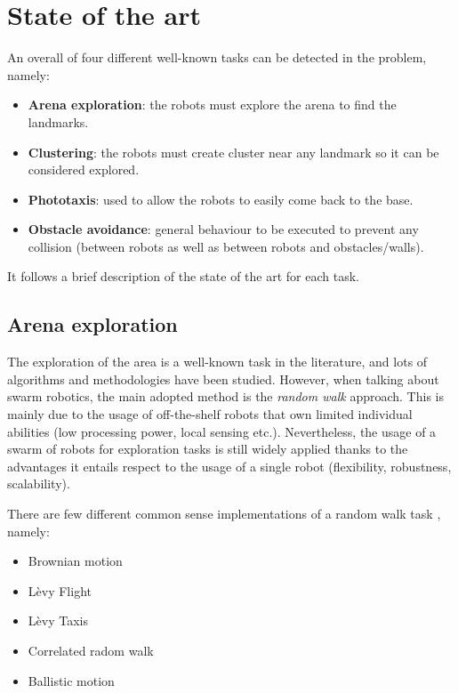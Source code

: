 \chapter{State of the art}

An overall of four different well-known tasks can be detected in the problem, namely:

\begin{itemize}

  \item \textbf{Arena exploration}: the robots must explore the arena to find the landmarks.
  \item \textbf{Clustering}: the robots must create cluster near any landmark so it can be considered explored.
  \item \textbf{Phototaxis}: used to allow the robots to easily come back to the base.
  \item \textbf{Obstacle avoidance}: general behaviour to be executed to prevent any collision (between robots as well as between robots and obstacles/walls).

\end{itemize}

\noindent
It follows a brief description of the state of the art for each task.

\section{Arena exploration}
The exploration of the area is a well-known task in the literature, and lots of algorithms and methodologies have been studied. However, when talking about swarm robotics, the main adopted method is the \textit{random walk} approach. This is mainly due to the usage of off-the-shelf robots that own limited individual abilities (low processing power, local sensing etc.). Nevertheless, the usage of a swarm of robots for exploration tasks is still widely applied thanks to the advantages it entails respect to the usage of a single robot (flexibility, robustness, scalability).

\bigskip
There are few different common sense implementations of a random walk task \cite{rw-summary}, namely:

\begin{itemize}

  \item {Brownian motion}
  
  \item {Lèvy Flight}
  
  \item {Lèvy Taxis}

  \item {Correlated radom walk}

  \item{Ballistic motion}  
\end{itemize}
 
